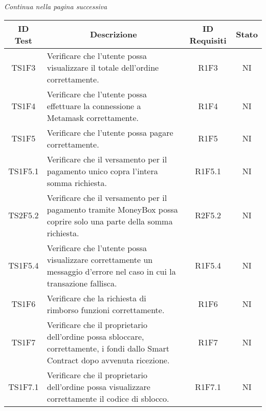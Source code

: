 \begin{center}
  \textit{\small Continua nella pagina successiva}
\end{center}
\begin{table}[H]
  \centering
  \renewcommand{\arraystretch}{1.8}
  \begin{tabular}{c|p{8cm}|c|c}
    \rowcolor[HTML]{125E28}
    \color[HTML]{FFFFFF}\textbf{ID Test}
              & \multicolumn{1}{c}{\color[HTML]{FFFFFF}\textbf{Descrizione}}
              & \color[HTML]{FFFFFF}\textbf{ID Requisiti}
              & \color[HTML]{FFFFFF}\textbf{Stato}                                                                                                                     \\
    \hline
    TS1F3     & Verificare che l'utente possa visualizzare il totale dell'ordine correttamente.                                                        & R1F3     & NI \\
    TS1F4     & Verificare che l'utente possa effettuare la connessione a Metamask\glo{} correttamente.                                                & R1F4     & NI \\
    TS1F5     & Verificare che l'utente possa pagare correttamente.                                                                                    & R1F5     & NI \\
    TS1F5.1   & Verificare che il versamento per il pagamento unico copra l'intera somma richiesta.                                                    & R1F5.1   & NI \\
    TS2F5.2   & Verificare che il versamento per il pagamento tramite MoneyBox\glo{} possa coprire solo una parte della somma richiesta.               & R2F5.2   & NI \\
    TS1F5.4   & Verificare che l'utente possa visualizzare correttamente un messaggio d'errore nel caso in cui la transazione fallisca.                & R1F5.4   & NI \\
    TS1F6     & Verificare che la richiesta di rimborso funzioni correttamente.                                                                        & R1F6     & NI \\
    TS1F7     & Verificare che il proprietario dell'ordine possa sbloccare, correttamente, i fondi dallo Smart Contract\glo{} dopo avvenuta ricezione. & R1F7     & NI \\
    TS1F7.1   & Verificare che il proprietario dell'ordine possa visualizzare correttamente il codice di sblocco.                                      & R1F7.1   & NI \\

\end{tabular}
\end{table}
